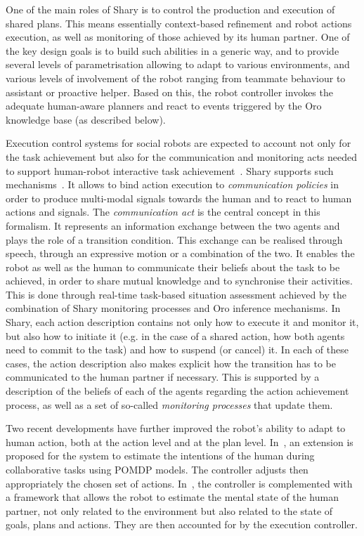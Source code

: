 \documentclass[preprint,3p,times]{elsarticle}
\newcommand{\eg}{e.g.\xspace}
\begin{document}
One of the main roles of {\sc Shary} is to control the production and execution
of shared plans. This means essentially context-based refinement and robot
actions execution, as well as monitoring of those achieved by its human
partner. One of the key design goals is to build such abilities in a generic
way, and to provide several levels of parametrisation allowing to adapt to
various environments, and various levels of involvement of the robot ranging
from teammate behaviour to assistant or proactive helper. Based on this,
the robot controller invokes the adequate human-aware planners and react to
events triggered by the {\sc Oro} knowledge base (as described below).

Execution control systems for social robots are expected 
to account not only for the task achievement but also for the communication
and monitoring acts needed to support human-robot interactive task
achievement~\cite{Rich1997,Sidner2005,sebanz2006joint}. {\sc Shary} supports
such mechanisms~\cite{Clodic2007smc}. It allows
to bind action execution to \emph{communication policies} in order to produce
multi-modal signals towards the human and to react to human actions and signals. The
\emph{communication act} is the central concept in this formalism. It
represents an information exchange between the two agents and plays the role of
a transition condition. This exchange can be realised through speech, through an
expressive motion or a combination of the two. It enables the robot as well as the human to
communicate their beliefs about the task to be achieved, in order to share
mutual knowledge and to synchronise their activities.  This is done through
real-time task-based situation assessment achieved by the combination of {\sc
Shary} monitoring processes and {\sc Oro} inference mechanisms. In {\sc Shary},
each action description contains not only how to execute it and monitor it,
but also how to initiate it (\eg in the case of a shared action, how
both agents need to commit to the task) and how to suspend (or cancel) it. In
each of these cases, the action description also makes explicit how the
transition has to be communicated to the human partner if necessary. This is
supported by a description of the beliefs of each of the agents
regarding the action achievement process, as well as a set of so-called
\emph{monitoring processes} that update them.

Two recent developments have further improved the robot's ability to adapt to
human action, both at the action level and at the plan level.
In~\cite{fiore2014}, an extension is proposed for the
system to estimate the intentions of the human during collaborative tasks using
POMDP models. The controller adjusts then appropriately the chosen set of actions.
In~\cite{devin2016implemented}, the controller is complemented with a framework
that allows the robot to estimate the mental state of the human partner, not
only related to the environment but also related to the state of goals, plans
and actions. They are then accounted for by the execution controller.
\end{document}
